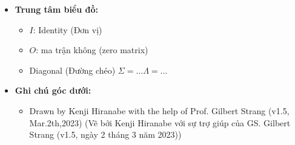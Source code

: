 \begin{itemize}
\begin{itemize}
\end{itemize}
  \item \textbf{Trung tâm biểu đồ:}
\begin{itemize}
  \item $I$: Identity (Đơn vị)
  \item $O$: ma trận không (zero matrix)
  \item Diagonal (Đường chéo) $\Sigma = \dots \Lambda = \dots$
\end{itemize}
  \item \textbf{Ghi chú góc dưới:}
\begin{itemize}
  \item Drawn by Kenji Hiranabe with the help of Prof. Gilbert Strang (v1.5, Mar.2th,2023) (Vẽ bởi Kenji Hiranabe với sự trợ giúp của GS. Gilbert Strang (v1.5, ngày 2 tháng 3 năm 2023))
\end{itemize}
\end{itemize}
